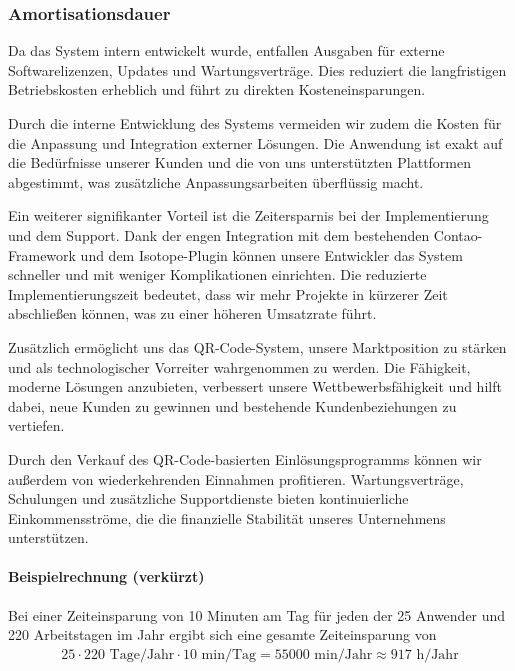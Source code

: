 \subsubsection{Amortisationsdauer}
\label{sec:Amortisationsdauer}

Da das System intern entwickelt wurde, entfallen Ausgaben für externe Softwarelizenzen, Updates und Wartungsverträge. Dies reduziert die langfristigen Betriebskosten erheblich und führt zu direkten Kosteneinsparungen.

Durch die interne Entwicklung des Systems vermeiden wir zudem die Kosten für die Anpassung und Integration externer Lösungen. Die Anwendung ist exakt auf die Bedürfnisse unserer Kunden und die von uns unterstützten Plattformen abgestimmt, was zusätzliche Anpassungsarbeiten überflüssig macht.

Ein weiterer signifikanter Vorteil ist die Zeitersparnis bei der Implementierung und dem Support. Dank der engen Integration mit dem bestehenden Contao-Framework und dem Isotope-Plugin können unsere Entwickler das System schneller und mit weniger Komplikationen einrichten. Die reduzierte Implementierungszeit bedeutet, dass wir mehr Projekte in kürzerer Zeit abschließen können, was zu einer höheren Umsatzrate führt.

Zusätzlich ermöglicht uns das QR-Code-System, unsere Marktposition zu stärken und als technologischer Vorreiter wahrgenommen zu werden. Die Fähigkeit, moderne Lösungen anzubieten, verbessert unsere Wettbewerbsfähigkeit und hilft dabei, neue Kunden zu gewinnen und bestehende Kundenbeziehungen zu vertiefen.

Durch den Verkauf des QR-Code-basierten Einlösungsprogramms können wir außerdem von wiederkehrenden Einnahmen profitieren. Wartungsverträge, Schulungen und zusätzliche Supportdienste bieten kontinuierliche Einkommensströme, die die finanzielle Stabilität unseres Unternehmens unterstützen.

\paragraph{Beispielrechnung (verkürzt)}
Bei einer Zeiteinsparung von 10 Minuten am Tag für jeden der 25 Anwender und 220 Arbeitstagen im Jahr ergibt sich eine gesamte Zeiteinsparung von 
\begin{eqnarray}
25 \cdot 220 \mbox{ Tage/Jahr} \cdot 10 \mbox{ min/Tag} = 55000 \mbox{ min/Jahr} \approx 917 \mbox{ h/Jahr} 
\end{eqnarray}

